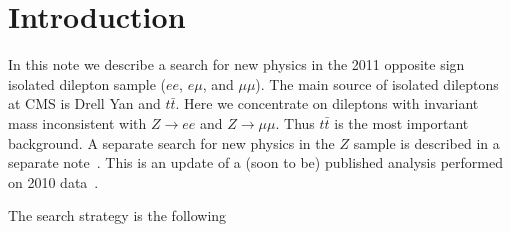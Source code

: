 \section{Introduction}
\label{sec:intro}

In this note we describe a search for new physics in the 2011 
opposite sign isolated dilepton sample ($ee$, $e\mu$, and $\mu\mu$).  
The main source of 
isolated dileptons at CMS is Drell Yan and $t\bar{t}$.
Here we concentrate on dileptons with invariant mass inconsistent
with $Z \to ee$ and $Z \to \mu\mu$.  Thus $t\bar{t}$ is the most
important background.  A separate search for new physics in the $Z$ 
sample is described in a separate note~\cite{ref:Ztemplates}.
This is an update of a (soon to be) published analysis performed 
on 2010 data~\cite{ref:osnote,ref:ospaper}. 

The search strategy is the following

